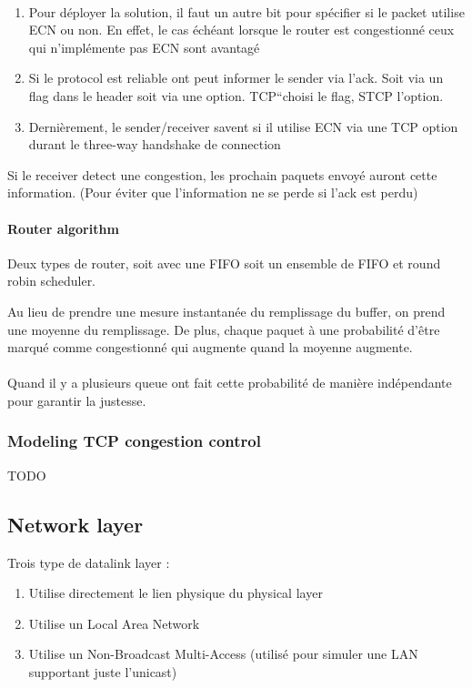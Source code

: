 \paragraph{}
\begin{enumerate}
    \item Pour déployer la solution, il faut un autre bit pour spécifier si le packet utilise
        ECN ou non. En effet, le cas échéant lorsque le router est congestionné ceux qui
        n'implémente pas ECN sont avantagé
    \item Si le protocol est reliable ont peut informer le sender via l'ack. Soit via
        un flag dans le header soit via une option. TCP``choisi le flag, STCP l'option.
    \item Dernièrement, le sender/receiver savent si il utilise ECN via une TCP option
        durant le three-way handshake de connection
\end{enumerate}

Si le receiver detect une congestion, les prochain paquets envoyé auront cette information.
(Pour éviter que l'information ne se perde si l'ack est perdu)

\paragraph{Router algorithm}
Deux types de router, soit avec une FIFO soit un ensemble de FIFO et round robin scheduler.

Au lieu de prendre une mesure instantanée du remplissage du buffer, on prend une moyenne
du remplissage.
De plus, chaque paquet à une probabilité d'être marqué comme congestionné qui augmente
quand la moyenne augmente.

\paragraph{}
Quand il y a plusieurs queue ont fait cette probabilité de manière indépendante pour
garantir la justesse.

\subsubsection{Modeling TCP congestion control}
TODO

\subsection{Network layer}
Trois type de datalink layer :
\begin{enumerate}
    \item Utilise directement le lien physique du physical layer
    \item Utilise un Local Area Network
    \item Utilise un Non-Broadcast Multi-Access (utilisé pour simuler une LAN supportant
        juste l'unicast)
\end{enumerate}

